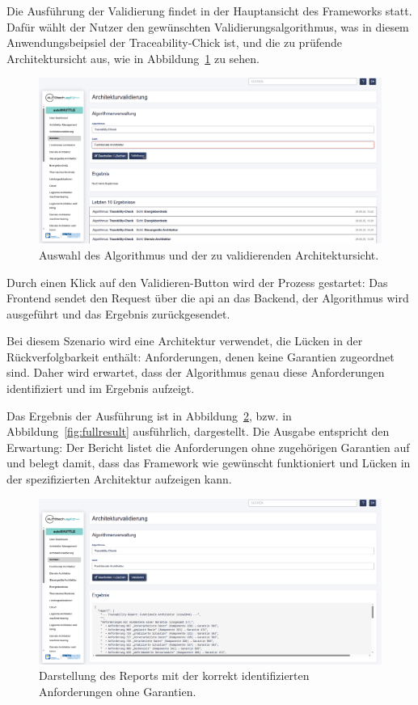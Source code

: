 Die Ausführung der Validierung findet in der Hauptansicht des Frameworks statt. Dafür wählt der Nutzer den gewünschten Validierungsalgorithmus, was in diesem Anwendungsbeipsiel der Traceability-Chick ist, und die zu prüfende Architektursicht aus, wie in Abbildung~\ref{fig:valstart} zu sehen.

\begin{figure}[htp!]
  \centering
  \includegraphics[width=\textwidth]{figures/06Evaluation/Bildschirmfoto vom 2025-06-30 09-16-40.png}
  \caption{Auswahl des Algorithmus und der zu validierenden Architektursicht.}
  \label{fig:valstart}
\end{figure}

Durch einen Klick auf den \glqq Validieren\grqq{}-Button wird der Prozess gestartet: Das Frontend sendet den Request über die \gls{api} an das Backend, der Algorithmus wird ausgeführt und das Ergebnis zurückgesendet.

Bei diesem Szenario wird eine Architektur verwendet, die Lücken in der Rückverfolgbarkeit enthält: Anforderungen, denen keine Garantien zugeordnet sind. Daher wird erwartet, dass der Algorithmus genau diese Anforderungen identifiziert und im Ergebnis aufzeigt.

Das Ergebnis der Ausführung ist in Abbildung~\ref{fig:valresult}, bzw. in Abbildung~\ref{fig:fullresult} ausführlich, dargestellt. Die Ausgabe entspricht den Erwartung: Der Bericht listet die Anforderungen ohne zugehörigen Garantien auf und belegt damit, dass das Framework wie gewünscht funktioniert und Lücken in der spezifizierten Architektur aufzeigen kann.

\begin{figure}[htp!]
  \centering
  \includegraphics[width=\textwidth]{figures/06Evaluation/Bildschirmfoto vom 2025-06-30 09-17-02.png}
  \caption{Darstellung des Reports mit der korrekt identifizierten Anforderungen ohne Garantien.}
  \label{fig:valresult}
\end{figure}


